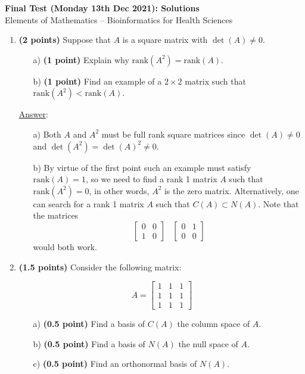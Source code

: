 \documentclass[]{book}
\theoremstyle{definition}
\newcommand{\rank}{\textrm{rank}}
\newcommand\ans{\underline{Answer}: }
\begin{document}
\begin{center}
\textbf{Final Test (Monday 13th Dec 2021): Solutions}\\
Elements of Mathematics -- Bioinformatics for Health Sciences \\
\end{center}

\vspace{0.2 cm}

\begin{enumerate}



\item {\bf (2 points)} Suppose that $A$ is a square matrix with $\det(A)\neq0$.
\begin{itemize}
\item[a)] {\bf (1 point)} Explain why $\rank(A^2) = \rank(A)$.
\item[b)] {\bf (1 point)} Find an example of a $2\times 2$ matrix such that $\rank(A^2) < \rank(A)$. 
\end{itemize}
\ans 
\begin{itemize}
\item[a)] Both $A$ and $A^2$ must be full rank square matrices since $\det(A)\neq 0$ and $\det(A^2) = \det(A)^2 \neq 0$.
\item[b)] By virtue of the first point such an example must satisfy $\rank(A) = 1$, so we need to find a rank 1 matrix $A$ such that $\rank(A^2)=0$, in other words, $A^2$ is the zero matrix. Alternatively, one can search for a rank 1 matrix $A$ such that $C(A) \subset N(A)$. Note that the matrices
\[
\begin{bmatrix}
0 & 0 \\
1 & 0 
\end{bmatrix}
\;\;\;
\begin{bmatrix}
0 & 1 \\
0 & 0 
\end{bmatrix}
\]
would both work.

\end{itemize}


\item {\bf (1.5 points)} Consider the following matrix:

\[
A = \begin{bmatrix}
1 & 1 & 1 \\
1 & 1 & 1 \\
1 & 1 & 1
\end{bmatrix}
\]
\begin{itemize}
\item[a)] {\bf (0.5 point)} Find a basis of $C(A)$ the column space of $A$.
\item[b)] {\bf (0.5 point)} Find a basis of $N(A)$ the null space of $A$.
\item[c)] {\bf (0.5 point)} Find an orthonormal basis of $N(A)$.
\end{itemize}


\end{enumerate}
\end{document}
